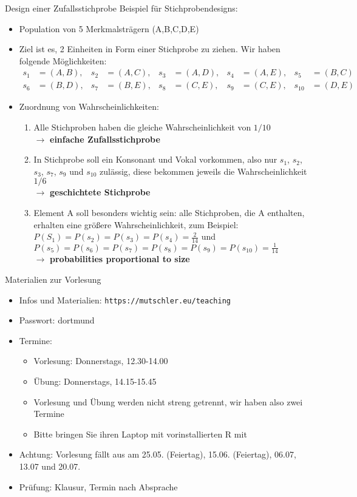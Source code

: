 \documentclass[9pt]{beamer}
\begin{document}
\begin{frame}{Design einer Zufallsstichprobe}
Beispiel für Stichprobendesigns:
  \begin{itemize}
    \item Population von 5 Merkmalstr\"{a}gern (A,B,C,D,E)
    \item Ziel ist es, 2 Einheiten in Form einer Stichprobe zu ziehen. Wir haben folgende M\"{o}glichkeiten:
    \begin{align*}
      s_1 &= (A,B),& s_2 &= (A,C),& s_3 &= (A,D),& s_4 &= (A,E),& s_5 &= (B,C)\\
      s_6 &= (B,D),& s_7 &= (B,E),& s_8 &= (C,E),& s_9 &= (C,E),& s_{10} &= (D,E)
    \end{align*}
    \item Zuordnung von Wahrscheinlichkeiten:
    \begin{enumerate}
      \item Alle Stichproben haben die gleiche Wahrscheinlichkeit von $1/10$\\ $\rightarrow$ \textbf{einfache Zufallsstichprobe}
      \item In Stichprobe soll ein Konsonant und Vokal vorkommen, also nur $s_1$, $s_2$, $s_3$, $s_7$, $s_9$ und $s_{10}$ zul\"{a}ssig, diese bekommen jeweils die Wahrscheinlichkeit $1/6$\\ $\rightarrow$ \textbf{geschichtete Stichprobe}
      \item Element A soll besonders wichtig sein: alle Stichproben, die A enthalten, erhalten eine gr\"{o}{\ss}ere Wahrscheinlichkeit, zum Beispiel: $P(S_1)= P(s_2)=P(s_3)=P(s_4)=\frac{2}{14}$ und $P(s_5)=P(s_6)=P(s_7)=P(s_8)=P(s_9)=P(s_{10})=\frac{1}{14}$\\ $\rightarrow$ \textbf{probabilities proportional to size}
    \end{enumerate}
  \end{itemize}
\end{frame}


\begin{frame}{Materialien zur Vorlesung}
\begin{itemize}
\item Infos und Materialien: \texttt{https://mutschler.eu/teaching}
\item Passwort: dortmund
\item Termine: 
\begin{itemize}
\item Vorlesung: Donnerstags, 12.30-14.00 
\item \"{U}bung: Donnerstags, 14.15-15.45
\item Vorlesung und Übung werden nicht streng getrennt, wir haben also zwei Termine
\item Bitte bringen Sie ihren Laptop mit vorinstallierten R mit
\end{itemize}
\item Achtung: Vorlesung f\"{a}llt aus am 25.05. (Feiertag), 15.06. (Feiertag), 06.07, 13.07 und 20.07.
\item Pr\"{u}fung: Klausur, Termin nach Absprache
\end{itemize}
\end{frame}
\end{document}
